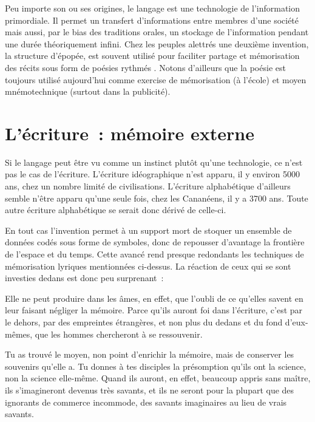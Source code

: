 Peu importe son ou ses origines, le langage est une technologie de l'information primordiale. Il permet un transfert d'informations entre membres d'une société mais aussi, par le bias des traditions orales, un stockage de l'information pendant une durée théoriquement infini. Chez les peuples alettrés une deuxième invention, la structure d'épopée, est souvent utilisé pour faciliter partage et mémorisation des récits sous form de poésies rythmés \cite{havelock-preface-plato}. Notons d'ailleurs que la poésie est toujours utilisé aujourd'hui comme exercise de mémorisation (à l'école) et moyen mnémotechnique (surtout dans la publicité).

\chapter{L'écriture~: mémoire externe}
Si le langage peut être vu comme un instinct plutôt qu'une technologie, ce n'est pas le cas de l'écriture. L'écriture idéographique n'est apparu, il y environ 5000 ans, chez un nombre limité de civilisations. L'écriture alphabétique d'ailleurs semble n'être apparu qu'une seule fois, chez les Cananéens, il y a 3700 ans\cite{linguistics-pinker}. Toute autre écriture alphabétique se serait donc dérivé de celle-ci.

En tout cas l'invention permet à un support mort de stoquer un ensemble de données codés sous forme de symboles, donc de repousser d'avantage la frontière de l'espace et du temps. Cette avancé rend presque redondants les techniques de mémorisation lyriques mentionnées ci-dessus. La réaction de ceux qui se sont investies dedans est donc peu surprenant~:


\begin{coolquote}
Elle ne peut produire dans les âmes, en effet, que l’oubli de ce qu’elles  savent en leur faisant négliger la mémoire. Parce qu’ils auront foi dans  l’écriture, c’est par le dehors, par des empreintes étrangères, et non plus du dedans et du fond d’eux-mêmes, que les hommes chercheront à se ressouvenir. 

Tu as trouvé le moyen, non point d’enrichir la mémoire, mais de conserver les souvenirs qu’elle a. Tu donnes à tes disciples la présomption qu’ils ont la science, non la science elle-même. Quand ils auront, en effet, beaucoup appris sans maître, ils s’imagineront devenus très savants, et ils ne seront pour la plupart que des ignorants de commerce incommode, des savants imaginaires au lieu de vrais savants.
\end{coolquote}


